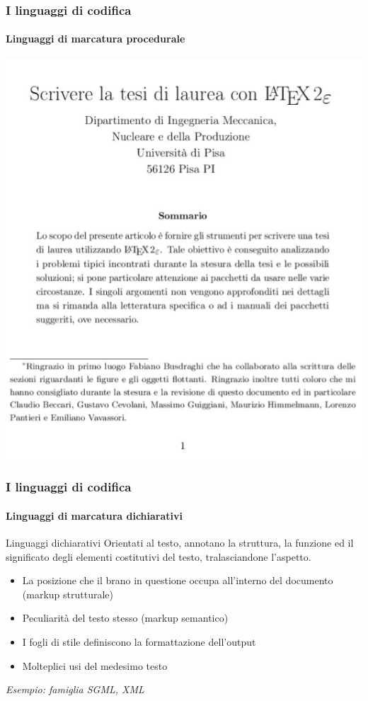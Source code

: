 \documentclass{beamer}
\begin{document}
\begin{frame}
	\frametitle{I linguaggi di codifica}
	\framesubtitle{Linguaggi di marcatura procedurale}
	\addtocounter{nframe}{1}

	\begin{center}
		\includegraphics[width=.7\textwidth]{imgs/LatexDoc.jpg}
	\end{center}

\end{frame}

\begin{frame}
	\frametitle{I linguaggi di codifica}
	\framesubtitle{Linguaggi di marcatura dichiarativi}
	\addtocounter{nframe}{1}

	\begin{block}{Linguaggi dichiarativi}
		Orientati al testo, annotano la struttura, la funzione ed il significato degli elementi costitutivi
		del testo, tralasciandone l’aspetto.
		\begin{itemize}
			\item La posizione che il brano in questione occupa all’interno del documento (markup strutturale)
			\item Peculiarità del testo stesso (markup semantico)
			\item I fogli di stile definiscono la formattazione dell’output
			\item Molteplici usi del medesimo testo
		\end{itemize}
	\end{block}
    \textit{Esempio: famiglia SGML, XML}
	
\end{frame}
\end{document}
